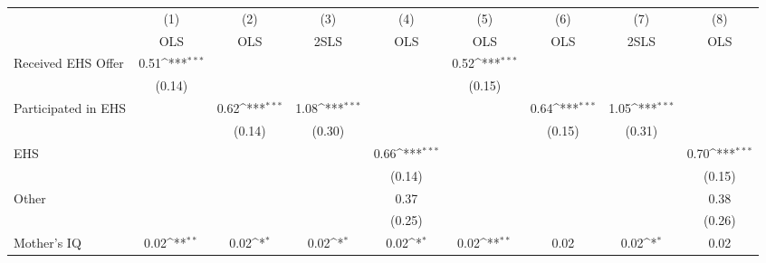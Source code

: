{
\def\sym#1{\ifmmode^{#1}\else\(^{#1}\)\fi}
\begin{tabular}{l*{8}{c}}
\hline\hline
                    &\multicolumn{1}{c}{(1)}&\multicolumn{1}{c}{(2)}&\multicolumn{1}{c}{(3)}&\multicolumn{1}{c}{(4)}&\multicolumn{1}{c}{(5)}&\multicolumn{1}{c}{(6)}&\multicolumn{1}{c}{(7)}&\multicolumn{1}{c}{(8)}\\
                    &\multicolumn{1}{c}{OLS}&\multicolumn{1}{c}{OLS}&\multicolumn{1}{c}{2SLS}&\multicolumn{1}{c}{OLS}&\multicolumn{1}{c}{OLS}&\multicolumn{1}{c}{OLS}&\multicolumn{1}{c}{2SLS}&\multicolumn{1}{c}{OLS}\\
\hline
Received EHS Offer  &        0.51\sym{***}&                     &                     &                     &        0.52\sym{***}&                     &                     &                     \\
                    &      (0.14)         &                     &                     &                     &      (0.15)         &                     &                     &                     \\
[1em]
Participated in EHS &                     &        0.62\sym{***}&        1.08\sym{***}&                     &                     &        0.64\sym{***}&        1.05\sym{***}&                     \\
                    &                     &      (0.14)         &      (0.30)         &                     &                     &      (0.15)         &      (0.31)         &                     \\
[1em]
EHS                 &                     &                     &                     &        0.66\sym{***}&                     &                     &                     &        0.70\sym{***}\\
                    &                     &                     &                     &      (0.14)         &                     &                     &                     &      (0.15)         \\
[1em]
Other               &                     &                     &                     &        0.37         &                     &                     &                     &        0.38         \\
                    &                     &                     &                     &      (0.25)         &                     &                     &                     &      (0.26)         \\
[1em]
Mother's IQ         &        0.02\sym{**} &        0.02\sym{*}  &        0.02\sym{*}  &        0.02\sym{*}  &        0.02\sym{**} &        0.02         &        0.02\sym{*}  &        0.02         \\

\end{tabular}}
